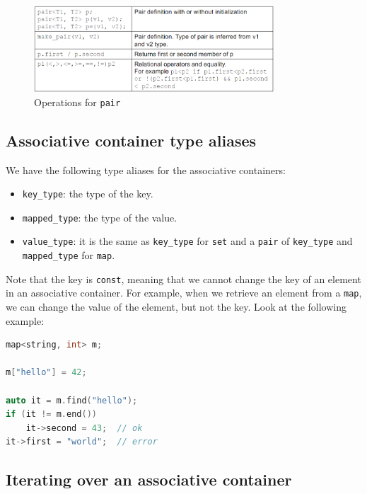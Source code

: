 \begin{figure}[H]
    \centering
    \includegraphics[width=0.8\textwidth]{figures/pair_ops.png}
    \caption{Operations for \texttt{pair}}
    \label{fig:pair_ops}
\end{figure}

\subsection{Associative container type aliases}

We have the following type aliases for the associative containers:

\begin{itemize}
    \item \texttt{key\_type}: the type of the key.
    \item \texttt{mapped\_type}: the type of the value.
    \item \texttt{value\_type}: it is the same as \texttt{key\_type} for \texttt{set} and
    a \texttt{pair} of \texttt{key\_type} and \texttt{mapped\_type} for \texttt{map}.
\end{itemize}

Note that the key is \texttt{const}, meaning that we cannot change the key of an element in
an associative container. For example, when we retrieve an element from a \texttt{map}, we can 
change the value of the element, but not the key. Look at the following example:\\

\begin{lstlisting}[language=C++]
map<string, int> m;

m["hello"] = 42;

auto it = m.find("hello");
if (it != m.end())
    it->second = 43;  // ok
it->first = "world";  // error
\end{lstlisting}

\subsection{Iterating over an associative container}

